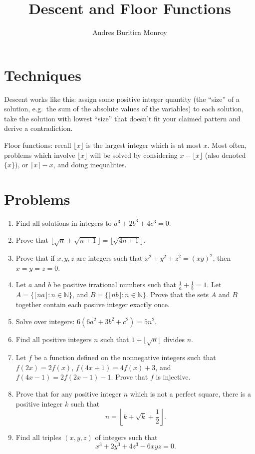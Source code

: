\documentclass{article}
\title{Descent and Floor Functions}
\author{Andres Buritica Monroy}
\date{}
\begin{document}
\maketitle
\section{Techniques}
  Descent works like this: assign some positive integer quantity
  (the ``size'' of a solution, e.g.\ the sum of the absolute values of the
  variables) to each solution, take the solution with lowest
  ``size'' that doesn't fit your claimed pattern and derive a contradiction.

  Floor functions: recall $\lfloor x\rfloor$ is the largest integer which is at
  most $x$. Most often, problems which involve $\lfloor x\rfloor$ will be
  solved by considering $x-\lfloor x\rfloor$ (also denoted $\{x\}$), or $\lceil
  x\rceil-x$, and doing inequalities.
\section{Problems}
\begin{enumerate}
  \item Find all solutions in integers to $a^3+2b^3+4c^3=0$.
  \item Prove that $\lfloor\sqrt n+\sqrt{n+1}\rfloor=\lfloor\sqrt{4n+1}\rfloor$.
  \item Prove that if $x, y, z$ are integers such that $x^2+y^2+z^2=(xy)^2$,
      then $x=y=z=0$.
  \item Let $a$ and $b$ be positive irrational numbers such that $\frac 1a+\frac 1b=1$.
    Let $A=\{\lfloor na\rfloor: n\in\mathbb N\}$, and $B=\{\lfloor nb\rfloor:
    n\in\mathbb N\}$. Prove that the sets $A$ and $B$ together contain each
    posiive integer exactly once.
  \item Solve over integers: $6(6a^2 + 3b^2 + c^2) = 5n^2$.
  \item Find all positive integers $n$ such that $1+\lfloor\sqrt n\rfloor$
    divides $n$.
  \item Let $f$ be a function defined on the nonnegative integers such that
    $f(2x)=2f(x)$, $f(4x+1)=4f(x)+3$, and $f(4x-1)=2f(2x-1)-1$. Prove that $f$
    is injective.
  \item Prove that for any positive integer $n$ which is not a perfect square,
    there is a positive integer $k$ such that
    \[n=\left\lfloor k+\sqrt k+\frac12\right\rfloor.\]
  \item Find all triples $(x, y, z)$ of integers such that
    \[x^3 + 2y^3 + 4z^3 - 6xyz = 0.\]
\end{enumerate}
\newpage
\end{document}
